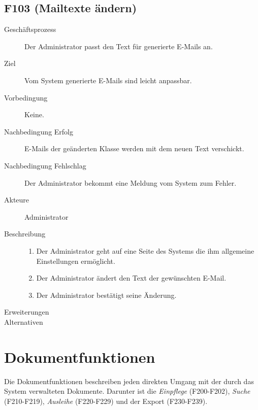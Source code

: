 \subsection{F103 (Mailtexte ändern)}
\begin{description}
  \item[Geschäftsprozess]Der Administrator passt den Text für generierte E-Mails an.
  \item[Ziel]Vom System generierte E-Mails sind leicht anpassbar.
  \item[Vorbedingung]Keine.
  \item[Nachbedingung Erfolg]E-Mails der geänderten Klasse werden mit dem neuen Text verschickt.
  \item[Nachbedingung Fehlschlag]Der Administrator bekommt eine Meldung vom System zum Fehler.
  \item[Akteure]Administrator
  \item[Beschreibung]\hfill
    \begin{enumerate}
      \item Der Administrator geht auf eine Seite des Systems die ihm allgemeine Einstellungen ermöglicht.
      \item Der Administrator ändert den Text der gewünschten E-Mail.
      \item Der Administrator bestätigt seine Änderung.
    \end{enumerate}
  \item[Erweiterungen]
  \item[Alternativen]
\end{description}


\section{Dokumentfunktionen}
Die Dokumentfunktionen beschreiben jeden direkten Umgang mit der durch das System verwalteten Dokumente. Darunter ist die \emph{Einpflege} (F200-F202), \emph{Suche} (F210-F219), \emph{Ausleihe} (F220-F229) und der Export (F230-F239).
